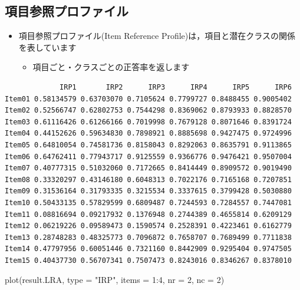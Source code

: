 \documentclass[
  a4paper,
]{ltjsbook}
\newenvironment{Shaded}{\begin{snugshade}}{\end{snugshade}}
\newcommand{\AttributeTok}[1]{\textcolor[rgb]{0.40,0.45,0.13}{#1}}
\newcommand{\DecValTok}[1]{\textcolor[rgb]{0.68,0.00,0.00}{#1}}
\newcommand{\FunctionTok}[1]{\textcolor[rgb]{0.28,0.35,0.67}{#1}}
\newcommand{\NormalTok}[1]{\textcolor[rgb]{0.00,0.23,0.31}{#1}}
\newcommand{\SpecialCharTok}[1]{\textcolor[rgb]{0.37,0.37,0.37}{#1}}
\newcommand{\StringTok}[1]{\textcolor[rgb]{0.13,0.47,0.30}{#1}}
\providecommand{\tightlist}{%
  \setlength{\itemsep}{0pt}\setlength{\parskip}{0pt}}\usepackage{longtable,booktabs,array}
\begin{document}
\subsection{項目参照プロファイル}\label{ux9805ux76eeux53c2ux7167ux30d7ux30edux30d5ux30a1ux30a4ux30eb-1}

\begin{itemize}
\tightlist
\item
  項目参照プロファイル(Item Reference
  Profile)は，項目と潜在クラスの関係を表しています

  \begin{itemize}
  \tightlist
  \item
    項目ごと・クラスごとの正答率を返します
  \end{itemize}
\end{itemize}

\begin{Shaded}
\end{Shaded}

\begin{verbatim}
             IRP1       IRP2      IRP3      IRP4      IRP5      IRP6
Item01 0.58134579 0.63703070 0.7105624 0.7799727 0.8488455 0.9005402
Item02 0.52566747 0.62802753 0.7544298 0.8369062 0.8793933 0.8828570
Item03 0.61116426 0.61266166 0.7019998 0.7679128 0.8071646 0.8391724
Item04 0.44152626 0.59634830 0.7898921 0.8885698 0.9427475 0.9724996
Item05 0.64810054 0.74581736 0.8158043 0.8292063 0.8635791 0.9113865
Item06 0.64762411 0.77943717 0.9125559 0.9366776 0.9476421 0.9507004
Item07 0.40777315 0.51032060 0.7172665 0.8414449 0.8909572 0.9019490
Item08 0.33320297 0.43146180 0.6048313 0.7022176 0.7165168 0.7207851
Item09 0.31536164 0.31793335 0.3215534 0.3337615 0.3799428 0.5030880
Item10 0.50433135 0.57829599 0.6809487 0.7244593 0.7284557 0.7447081
Item11 0.08816694 0.09217932 0.1376948 0.2744389 0.4655814 0.6209129
Item12 0.06219226 0.09589473 0.1590574 0.2528391 0.4223461 0.6162779
Item13 0.28748283 0.48325773 0.7096872 0.7658707 0.7689499 0.7711838
Item14 0.47797956 0.60051446 0.7321160 0.8442909 0.9295404 0.9747505
Item15 0.40437730 0.56707341 0.7507473 0.8243016 0.8346267 0.8378010
\end{verbatim}

\begin{Shaded}
\begin{Highlighting}[]
\FunctionTok{plot}\NormalTok{(result.LRA, }\AttributeTok{type =} \StringTok{"IRP"}\NormalTok{, }\AttributeTok{items =} \DecValTok{1}\SpecialCharTok{:}\DecValTok{4}\NormalTok{, }\AttributeTok{nr =} \DecValTok{2}\NormalTok{, }\AttributeTok{nc =} \DecValTok{2}\NormalTok{)}
\end{Highlighting}
\end{Shaded}
\end{document}
